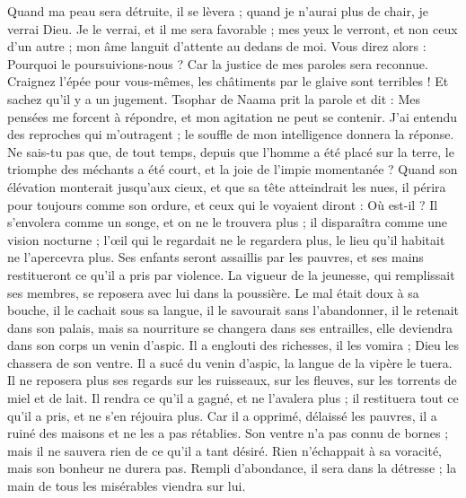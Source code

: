 \begin{multicols}{2}
Quand ma peau sera détruite, il se lèvera ; quand je n'aurai plus de chair, je verrai Dieu.
Je le verrai, et il me sera favorable ; mes yeux le verront, et non ceux d'un autre ; mon âme languit d'attente au dedans de moi.
Vous direz alors : Pourquoi le poursuivions-nous ? Car la justice de mes paroles sera reconnue.
Craignez l'épée pour vous-mêmes, les châtiments par le glaive sont terribles ! Et sachez qu'il y a un jugement.
\VerseOne{}Tsophar de Naama prit la parole et dit :
Mes pensées me forcent à répondre, et mon agitation ne peut se contenir.
J'ai entendu des reproches qui m'outragent ; le souffle de mon intelligence donnera la réponse.
Ne sais-tu pas que, de tout temps, depuis que l'homme a été placé sur la terre,
le triomphe des méchants a été court, et la joie de l'impie momentanée ?
Quand son élévation monterait jusqu'aux cieux, et que sa tête atteindrait les nues,
il périra pour toujours comme son ordure, et ceux qui le voyaient diront : Où est-il ?
Il s'envolera comme un songe, et on ne le trouvera plus ; il disparaîtra comme une vision nocturne ;
l'œil qui le regardait ne le regardera plus, le lieu qu'il habitait ne l'apercevra plus.
Ses enfants seront assaillis par les pauvres, et ses mains restitueront ce qu'il a pris par violence.
La vigueur de la jeunesse, qui remplissait ses membres, se reposera avec lui dans la poussière.
Le mal était doux à sa bouche, il le cachait sous sa langue,
il le savourait sans l'abandonner, il le retenait dans son palais,
mais sa nourriture se changera dans ses entrailles, elle deviendra dans son corps un venin d'aspic.
Il a englouti des richesses, il les vomira ; Dieu les chassera de son ventre.
Il a sucé du venin d'aspic, la langue de la vipère le tuera.
Il ne reposera plus ses regards sur les ruisseaux, sur les fleuves, sur les torrents de miel et de lait.
Il rendra ce qu'il a gagné, et ne l'avalera plus ; il restituera tout ce qu'il a pris, et ne s'en réjouira plus.
Car il a opprimé, délaissé les pauvres, il a ruiné des maisons et ne les a pas rétablies.
Son ventre n'a pas connu de bornes ; mais il ne sauvera rien de ce qu'il a tant désiré.
Rien n'échappait à sa voracité, mais son bonheur ne durera pas.
Rempli d'abondance, il sera dans la détresse ; la main de tous les misérables viendra sur lui.

\end{multicols}

